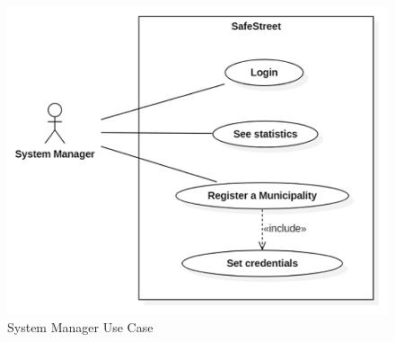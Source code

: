 \begin{figure}[h]
\centering
\includegraphics{Images/usecase_system_manager.png}
\caption{\label{fig:SMUC}System Manager Use Case }
\end{figure}
